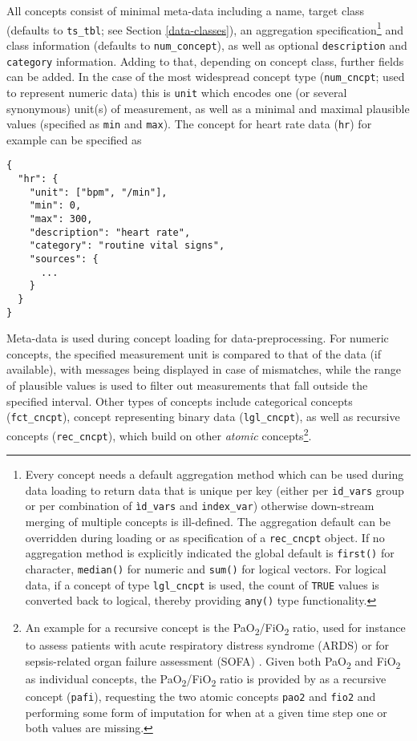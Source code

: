 \documentclass[
  notitle]{jss}
\begin{document}
All concepts consist of minimal meta-data including a name, target class
(defaults to \texttt{ts\_tbl}; see Section \ref{data-classes}), an
aggregation specification\footnote{Every concept needs a default
  aggregation method which can be used during data loading to return
  data that is unique per key (either per \texttt{id\_vars} group or per
  combination of \texttt{ìd\_vars} and \texttt{index\_var}) otherwise
  down-stream merging of multiple concepts is ill-defined. The
  aggregation default can be overridden during loading or as
  specification of a \texttt{rec\_cncpt} object. If no aggregation
  method is explicitly indicated the global default is \texttt{first()}
  for character, \texttt{median()} for numeric and \texttt{sum()} for
  logical vectors. For logical data, if a concept of type
  \texttt{lgl\_cncpt} is used, the count of \texttt{TRUE} values is
  converted back to logical, thereby providing \texttt{any()} type
  functionality.} and class information (defaults to
\texttt{num\_concept}), as well as optional \texttt{description} and
\texttt{category} information. Adding to that, depending on concept
class, further fields can be added. In the case of the most widespread
concept type (\texttt{num\_cncpt}; used to represent numeric data) this
is \texttt{unit} which encodes one (or several synonymous) unit(s) of
measurement, as well as a minimal and maximal plausible values
(specified as \texttt{min} and \texttt{max}). The concept for heart rate
data (\texttt{hr}) for example can be specified as

\begin{verbatim}
{
  "hr": {
    "unit": ["bpm", "/min"],
    "min": 0,
    "max": 300,
    "description": "heart rate",
    "category": "routine vital signs",
    "sources": {
      ...
    }
  }
}
\end{verbatim}

Meta-data is used during concept loading for data-preprocessing. For
numeric concepts, the specified measurement unit is compared to that of
the data (if available), with messages being displayed in case of
mismatches, while the range of plausible values is used to filter out
measurements that fall outside the specified interval. Other types of
concepts include categorical concepts (\texttt{fct\_cncpt}), concept
representing binary data (\texttt{lgl\_cncpt}), as well as recursive
concepts (\texttt{rec\_cncpt}), which build on other \emph{atomic}
concepts\footnote{An example for a recursive concept is the
  PaO\textsubscript{2}/FiO\textsubscript{2} ratio, used for instance to
  assess patients with acute respiratory distress syndrome (ARDS) or for
  sepsis-related organ failure assessment (SOFA)
  \citep{villar2013, vincent1996}. Given both PaO\textsubscript{2} and
  FiO\textsubscript{2} as individual concepts, the
  PaO\textsubscript{2}/FiO\textsubscript{2} ratio is provided by
   as a recursive concept (\texttt{pafi}), requesting the two
  atomic concepts \texttt{pao2} and \texttt{fio2} and performing some
  form of imputation for when at a given time step one or both values
  are missing.}.
\end{document}
